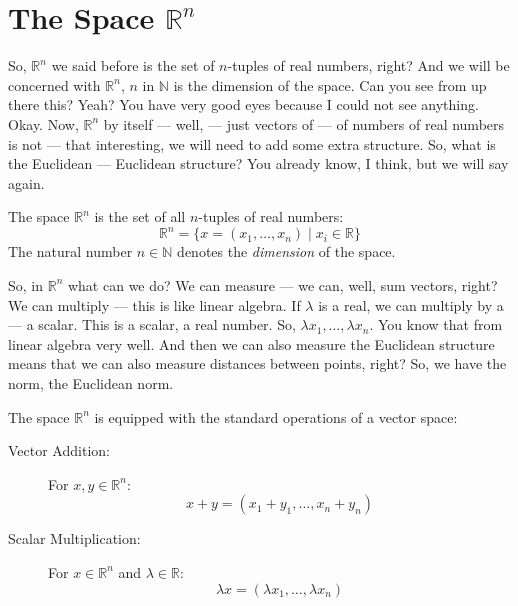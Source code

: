 \section{The Space \texorpdfstring{$\mathbb{R}^n$}{Rn}}

\begin{spoken-clean}[00:17:15 - 00:19:02]
So, $\mathbb{R}^n$ we said before is the set of $n$-tuples of real numbers, right?  And we will be concerned with $\mathbb{R}^n$, $n$ in $\mathbb{N}$ is the dimension of the space. Can you see from up there this? Yeah? You have very good eyes because I could not see anything. Okay. Now, $\mathbb{R}^n$ by itself --- well, --- just vectors of --- of numbers of real numbers is not --- that interesting, we will need to add some extra structure. So, what is the Euclidean --- Euclidean structure? You already know, I think, but we will say again.
\end{spoken-clean}

\begin{math-stroke}
\begin{definition}
The space $\mathbb{R}^n$ is the set of all $n$-tuples of real numbers:
\[ \mathbb{R}^n = \{ x = (x_1, \dots, x_n) \mid x_i \in \mathbb{R} \} \]
The natural number $n \in \mathbb{N}$ denotes the \emph{dimension} of the space.
\end{definition}
\end{math-stroke}

\begin{spoken-clean}[00:19:02 - 00:21:18]
So, in $\mathbb{R}^n$ what can we do? We can measure --- we can, well, sum vectors, right?  We can multiply --- this is like linear algebra. If $\lambda$ is a real, we can multiply by a --- a scalar. This is a scalar, a real number. So, $\lambda x_1, \dots, \lambda x_n$. You know that from linear algebra very well. And then we can also measure the Euclidean structure means that we can also measure distances between points, right? So, we have the norm, the Euclidean norm. 
\end{spoken-clean}

\begin{math-stroke}
The space $\mathbb{R}^n$ is equipped with the standard operations of a vector space:
\begin{description}
    \item[Vector Addition:] For $x, y \in \mathbb{R}^n$:
    \[ x + y = (x_1 + y_1, \dots, x_n + y_n) \]
    \item[Scalar Multiplication:] For $x \in \mathbb{R}^n$ and $\lambda \in \mathbb{R}$:
    \[ \lambda x = (\lambda x_1, \dots, \lambda x_n) \]
\end{description}
\end{math-stroke}

